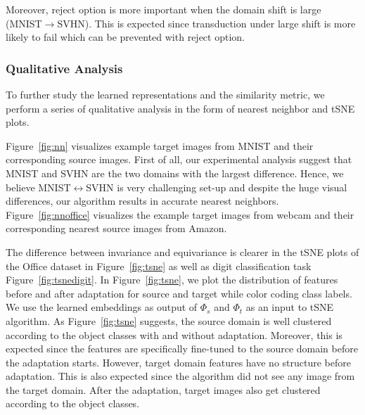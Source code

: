 \noindent Moreover, reject option is more important when the domain shift is large (\eg MNIST$\rightarrow$SVHN). This is expected since transduction under large  shift is more likely to fail which can be prevented with reject option.




\subsubsection{Qualitative Analysis}
To further study the learned representations and the similarity metric, we perform a series of qualitative analysis in the form of nearest neighbor and tSNE\cite{tsne} plots.


Figure~\ref{fig:nn} visualizes example target images from MNIST and their corresponding source images. First of all, our experimental analysis suggest that MNIST and SVHN are the two domains with the largest difference. Hence, we believe MNIST$\leftrightarrow$SVHN is very challenging set-up and despite the huge visual differences, our algorithm results in accurate nearest neighbors. Figure~\ref{fig:nnoffice} visualizes the example target images from webcam and their corresponding nearest source images from Amazon. 


The difference between invariance and equivariance is clearer in the tSNE plots of the Office dataset in Figure~\ref{fig:tsne} as well as digit classification task Figure~\ref{fig:tsnedigit}. In Figure~\ref{fig:tsne}, we plot the distribution of features before and after adaptation for source and target while color coding class labels. We use the learned embeddings as output of $\Phi_s$ and $\Phi_t$ as an input to tSNE algorithm\cite{tsne}. As Figure~\ref{fig:tsne} suggests, the source domain is well clustered according to the object classes with and without adaptation. Moreover, this is expected since the features are specifically fine-tuned to the source domain before the adaptation starts. However, target domain features have no structure before adaptation. This is also expected since the algorithm did not see any image from the target domain. After the adaptation, target images also get clustered according to the object classes. 




